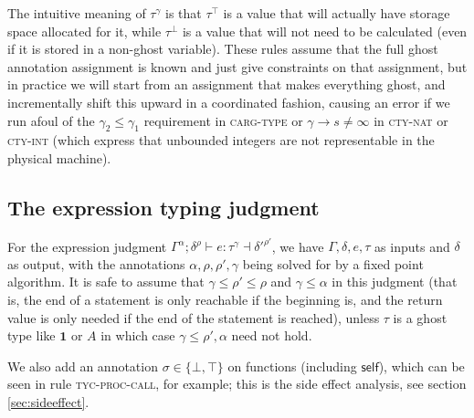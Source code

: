 \documentclass[acmsmall,nonacm]{acmart}
\newcommand{\proves}{\vdash}
\newcommand{\makes}{\dashv}
\begin{document}
The intuitive meaning of $\tau^\gamma$ is that $\tau^\top$ is a value that will actually have storage space allocated for it, while $\tau^\bot$ is a value that will not need to be calculated (even if it is stored in a non-ghost variable). These rules assume that the full ghost annotation assignment is known and just give constraints on that assignment, but in practice we will start from an assignment that makes everything ghost, and incrementally shift this upward in a coordinated fashion, causing an error if we run afoul of the $\gamma_2\le\gamma_1$ requirement in \textsc{carg-type} or $\gamma\to s\ne\infty$ in \textsc{cty-nat} or \textsc{cty-int} (which express that unbounded integers are not representable in the physical machine).

\subsection{The expression typing judgment}

For the expression judgment $\Gamma^\alpha;\delta^{\rho} \proves e:\tau^\gamma\makes{\delta'}^{\rho'}$, we have $\Gamma,\delta,e,\tau$ as inputs and $\delta$ as output, with the annotations $\alpha,\rho,\rho',\gamma$ being solved for by a fixed point algorithm. It is safe to assume that $\gamma\le \rho'\le \rho$ and $\gamma\le \alpha$ in this judgment (that is, the end of a statement is only reachable if the beginning is, and the return value is only needed if the end of the statement is reached), unless $\tau$ is a ghost type like $\mathbf{1}$ or $A$ in which case $\gamma\le \rho',\alpha$ need not hold.

We also add an annotation $\sigma\in\{\bot,\top\}$ on functions (including $\mathsf{self}$), which can be seen in rule \textsc{tyc-proc-call}, for example; this is the side effect analysis, see section \ref{sec:sideeffect}.
\end{document}
